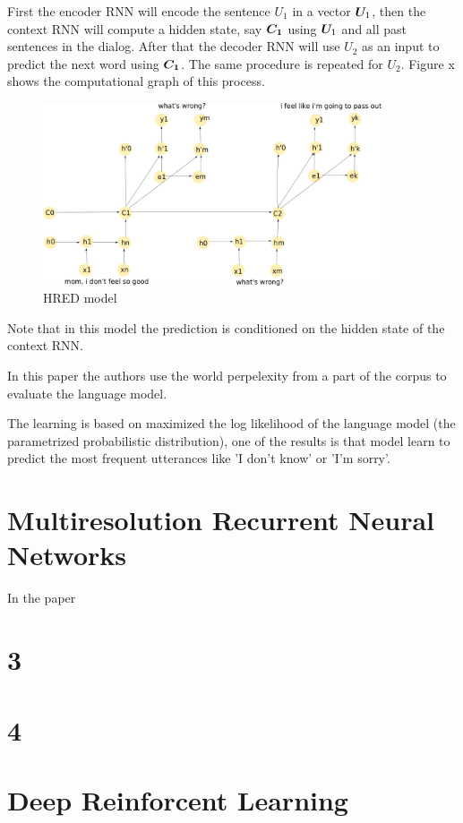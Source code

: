 First the encoder RNN will encode the sentence $U_1$ in a vector $\bm{U}_1$, then the context RNN will compute a hidden state, say $\bm{C_1}$ using $\bm{U}_1$ and all past sentences in the dialog. After that the decoder RNN will use $U_2$ as an input to predict the next word using $\bm{C_1}$. The same procedure is repeated for $U_2$. Figure
x shows the computational graph of this process.

\begin{figure}[ht!]
\label{HRED}
\includegraphics[width=10cm]{img/HRED_placeholder.png}
\caption{HRED model}
\end{figure}

Note that in this model the prediction is conditioned on the hidden state of the context RNN.

In this paper the authors use the world perpelexity from a part of the corpus to evaluate the language model.

The learning is based on maximized the log likelihood of the language model (the parametrized probabilistic distribution), one of the results is that model learn to predict the most frequent utterances like  'I don't know' or 'I'm sorry'.



\section{Multiresolution Recurrent Neural Networks}

In the paper \cite{Serban:2016b}

\section{3}

\section{4}

\section{Deep Reinforcent Learning}

